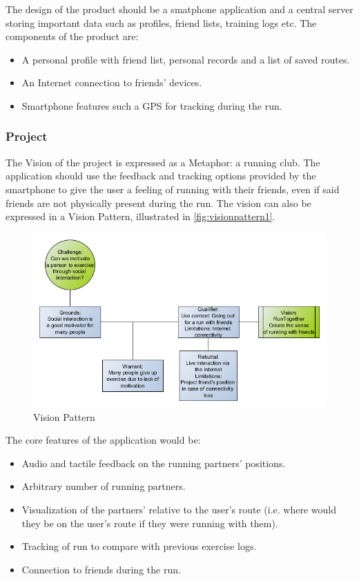 The design of the product should be a smatphone application and a central server storing important data such as profiles, friend lists, training logs etc.
The components of the product are:

\begin{itemize}
	\item{A personal profile with friend list, personal records and a list of saved routes.}
	\item{An Internet connection to friends' devices.}
	\item{Smartphone features such a \ac{GPS} for tracking during the run.}
\end{itemize}

\subsubsection{Project}
The Vision of the project is expressed as a Metaphor: a running club. The application should use the feedback and tracking options provided by the smartphone to give the user a feeling of running with their friends, even if said friends are not physically present during the run. The vision can also be expressed in a Vision Pattern, illustrated in \autoref{fig:visionpattern1}.

\begin{figure}[!ht]
	\begin{center}
		\includegraphics[scale=0.5]{img/visionpattern1.png}
		\caption{Vision Pattern}
		\label{fig:visionpattern1}
	\end{center}
\end{figure}

The core features of the application would be:

\begin{itemize}
	\item{Audio and tactile feedback on the running partners' positions.}
	\item{Arbitrary number of running partners.}
	\item{Visualization of the partners' relative to the user's route (i.e. where would they be on the user's route if they were running with them).}
	\item{Tracking of run to compare with previous exercise logs.}
	\item{Connection to friends during the run.}
\end{itemize}

